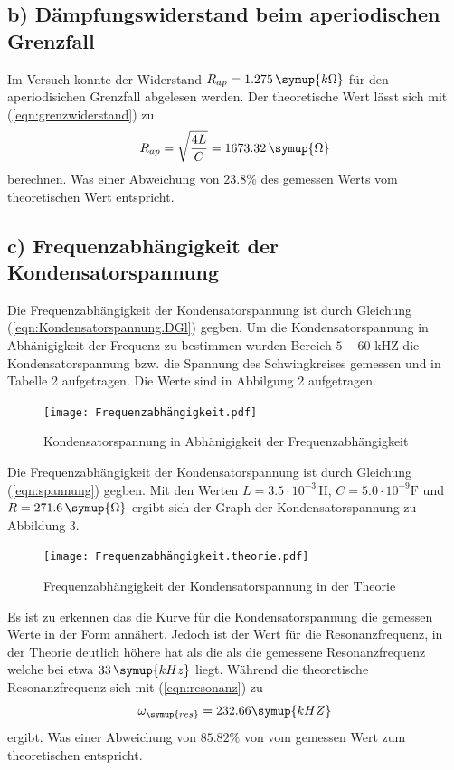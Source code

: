 \subsection{b) Dämpfungswiderstand beim aperiodischen Grenzfall}
        Im Versuch konnte der Widerstand $R_{ap} = 1.275 \, \symup{k\Omega}$ für den aperiodisichen Grenzfall abgelesen werden. Der theoretische Wert lässt sich mit (\ref{eqn:grenzwiderstand}) zu 
        \begin{equation*}
        R_{ap} = \sqrt{\frac{4L}{C}} = 1673.32\, \symup{\Omega}
        \end{equation*}
        berechnen. Was einer Abweichung von $23.8\%$ des gemessen Werts vom theoretischen Wert entspricht.
    \newpage
\subsection{c) Frequenzabhängigkeit der Kondensatorspannung}
        Die Frequenzabhängigkeit der Kondensatorspannung ist durch Gleichung (\ref{eqn:Kondensatorspannung.DGl}) gegben.
        Um die Kondensatorspannung in Abhänigigkeit der Frequenz zu bestimmen wurden Bereich $5-60$ kHZ die Kondensatorspannung bzw. die Spannung des Schwingkreises gemessen und in Tabelle 2 aufgetragen. Die Werte sind in Abbilgung 2 aufgetragen.
        \begin{figure}[H]
            \label{fig:Spannung}
             \texttt{[image: Frequenzabhängigkeit.pdf]}
            \caption{Kondensatorspannung in Abhänigigkeit der Frequenzabhängigkeit}
        \end{figure}
        Die Frequenzabhängigkeit der Kondensatorspannung ist durch Gleichung (\ref{eqn:spannung}) gegben. Mit den Werten $ L=3.5\cdot 10^{-3} \, \mathrm{H}$, $C=5.0 \cdot 10^{-9} \mathrm{F}$ und $R=271.6 \, \symup{\Omega}$ ergibt sich der Graph der Kondensatorspannung zu Abbildung 3.
        \begin{figure}[H]
            \label{fig:Spannung.theorie}
            \texttt{[image: Frequenzabhängigkeit.theorie.pdf]}
            \caption{Frequenzabhängigkeit der Kondensatorspannung in der Theorie}
        \end{figure}
        Es ist zu erkennen das die Kurve für die Kondensatorspannung die gemessen Werte in der Form annähert. Jedoch ist der Wert für die Resonanzfrequenz, in der Theorie deutlich höhere hat als die als die gemessene Resonanzfrequenz welche bei etwa $33 \, \symup{kHz}$ liegt. Während die theoretische Resonanzfrequenz sich mit (\ref{eqn:resonanz}) zu 
        \begin{equation*}
            \omega_{\symup{res}}= 232.66 \symup{kHZ}
        \end{equation*}
        ergibt. Was einer Abweichung von $85.82 \%$ von vom gemessen Wert zum theoretischen entspricht.
    \newpage
